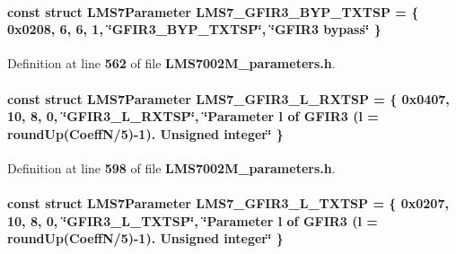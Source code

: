 \paragraph[{L\+M\+S7\+\_\+\+G\+F\+I\+R3\+\_\+\+B\+Y\+P\+\_\+\+T\+X\+T\+SP}]{\setlength{\rightskip}{0pt plus 5cm}const struct {\bf L\+M\+S7\+Parameter} L\+M\+S7\+\_\+\+G\+F\+I\+R3\+\_\+\+B\+Y\+P\+\_\+\+T\+X\+T\+SP = \{ 0x0208, 6, 6, 1, \char`\"{}\+G\+F\+I\+R3\+\_\+\+B\+Y\+P\+\_\+\+T\+X\+T\+S\+P\char`\"{}, \char`\"{}\+G\+F\+I\+R3 bypass\char`\"{} \}\hspace{0.3cm}{\ttfamily [static]}}\label{LMS7002M__parameters_8h_acc2cde5f6b4e00c4905eef71ec1a55d8}


Definition at line {\bf 562} of file {\bf L\+M\+S7002\+M\+\_\+parameters.\+h}.

\paragraph[{L\+M\+S7\+\_\+\+G\+F\+I\+R3\+\_\+\+L\+\_\+\+R\+X\+T\+SP}]{\setlength{\rightskip}{0pt plus 5cm}const struct {\bf L\+M\+S7\+Parameter} L\+M\+S7\+\_\+\+G\+F\+I\+R3\+\_\+\+L\+\_\+\+R\+X\+T\+SP = \{ 0x0407, 10, 8, 0, \char`\"{}\+G\+F\+I\+R3\+\_\+\+L\+\_\+\+R\+X\+T\+S\+P\char`\"{}, \char`\"{}\+Parameter l of G\+F\+I\+R3 (l = round\+Up(\+Coeff\+N/5)-\/1). Unsigned integer\char`\"{} \}\hspace{0.3cm}{\ttfamily [static]}}\label{LMS7002M__parameters_8h_a295543214ed8f3d1851f5ce32732826a}


Definition at line {\bf 598} of file {\bf L\+M\+S7002\+M\+\_\+parameters.\+h}.

\paragraph[{L\+M\+S7\+\_\+\+G\+F\+I\+R3\+\_\+\+L\+\_\+\+T\+X\+T\+SP}]{\setlength{\rightskip}{0pt plus 5cm}const struct {\bf L\+M\+S7\+Parameter} L\+M\+S7\+\_\+\+G\+F\+I\+R3\+\_\+\+L\+\_\+\+T\+X\+T\+SP = \{ 0x0207, 10, 8, 0, \char`\"{}\+G\+F\+I\+R3\+\_\+\+L\+\_\+\+T\+X\+T\+S\+P\char`\"{}, \char`\"{}\+Parameter l of G\+F\+I\+R3 (l = round\+Up(\+Coeff\+N/5)-\/1). Unsigned integer\char`\"{} \}\hspace{0.3cm}{\ttfamily [static]}}\label{LMS7002M__parameters_8h_a50c0360e91d0f25bba9e4965232fd2f4}


